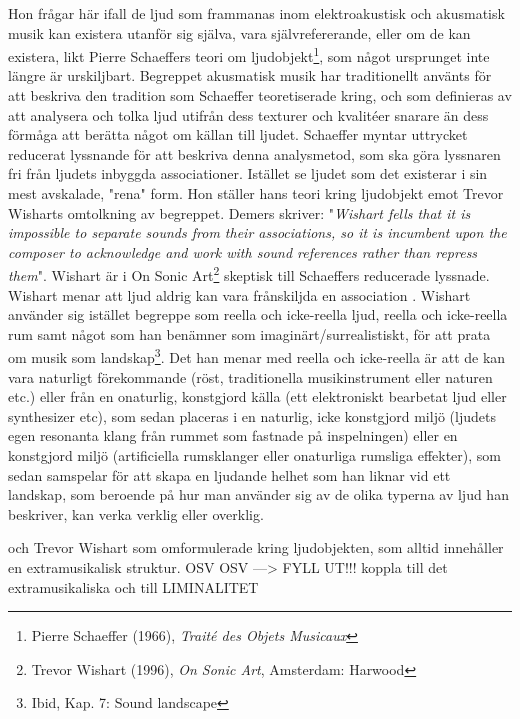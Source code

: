 \documentclass{article}
\begin{document}
Hon frågar här ifall de ljud som frammanas inom elektroakustisk och akusmatisk musik kan existera utanför sig
själva, vara självrefererande, eller om de kan existera, likt Pierre Schaeffers teori om
ljudobjekt\footnote{Pierre Schaeffer (1966), \emph{Traité des Objets Musicaux}}, som något ursprunget inte
längre är urskiljbart. Begreppet akusmatisk musik har traditionellt använts för att beskriva den tradition som
Schaeffer teoretiserade kring, och som definieras av att analysera och tolka ljud utifrån dess texturer och
kvalitéer snarare än dess förmåga att berätta något om källan till ljudet. Schaeffer myntar uttrycket reducerat 
lyssnande för att beskriva denna analysmetod, som ska göra lyssnaren fri från ljudets inbyggda associationer. 
Istället se ljudet som det existerar i sin mest avskalade, "rena" form. 
Hon ställer hans teori kring ljudobjekt emot Trevor Wisharts omtolkning av begreppet. Demers skriver:
"\emph{Wishart fells that it is impossible to separate sounds from their associations, so it is incumbent upon
the composer to acknowledge and work with sound references rather than repress them}". Wishart är i On Sonic
Art\footnote{Trevor Wishart (1996), \emph{On Sonic Art}, Amsterdam: Harwood} skeptisk till Schaeffers
reducerade lyssnade. Wishart menar att ljud aldrig kan vara frånskiljda en association
. Wishart använder sig istället begreppe som reella och icke-reella ljud, reella och
icke-reella rum samt något som han benämner som imaginärt/surrealistiskt, för att
prata om musik som landskap\footnote{Ibid, Kap. 7: Sound landscape}. Det han menar med reella och icke-reella
är att de kan vara naturligt förekommande (röst, traditionella musikinstrument eller naturen etc.) eller från en
onaturlig, konstgjord källa (ett elektroniskt bearbetat ljud eller synthesizer etc), som sedan placeras i en
naturlig, icke konstgjord miljö (ljudets egen resonanta klang från rummet som fastnade på inspelningen) eller
en konstgjord miljö (artificiella rumsklanger eller onaturliga rumsliga effekter), som sedan samspelar för att
skapa en ljudande helhet som han liknar vid ett landskap, som beroende på hur man använder sig av de olika
typerna av ljud han beskriver, kan verka verklig eller overklig. 


och Trevor Wishart som omformulerade kring
ljudobjekten, som alltid innehåller en extramusikalisk struktur. OSV OSV ---> FYLL UT!!! koppla till det
extramusikaliska och till LIMINALITET
\end{document}
